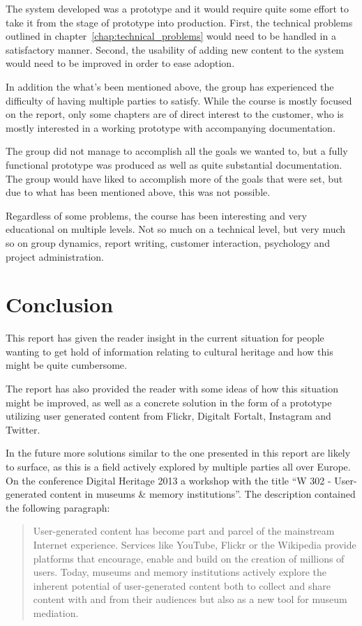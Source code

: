 \documentclass[11pt]{book}
\begin{document}
The system developed was a prototype and it would require quite some effort to take it from the stage of prototype into production. First, the technical problems outlined in chapter~\ref{chap:technical_problems} would need to be handled in a satisfactory manner. Second, the usability of adding new content to the system would need to be improved in order to ease adoption.

In addition the what's been mentioned above, the group has experienced the difficulty of having multiple parties to satisfy. While the course is mostly focused on the report, only some chapters are of direct interest to the customer, who is mostly interested in a working prototype with accompanying documentation.

The group did not manage to accomplish all the goals we wanted to, but a fully functional prototype was produced as well as quite substantial documentation. The group would have liked to accomplish more of the goals that were set, but due to what has been mentioned above, this was not possible.

Regardless of some problems, the course has been interesting and very educational on multiple levels. Not so much on a technical level, but very much so on group dynamics, report writing, customer interaction, psychology and project administration.

\chapter{Conclusion}
This report has given the reader insight in the current situation for people wanting to get hold of information relating to cultural heritage and how this might be quite cumbersome. 

The report has also provided the reader with some ideas of how this situation might be improved, as well as a concrete solution in the form of a prototype utilizing user generated content from Flickr, Digitalt Fortalt, Instagram and Twitter.

In the future more solutions similar to the one presented in this report are likely to surface, as this is a field actively explored by multiple parties all over Europe.
On the conference Digital Heritage 2013 a workshop with the title “W 302 - User-generated content in museums \& memory institutions”. The description contained the following paragraph:

\begin{quotation}\noindent
User-generated content has become part and parcel of the mainstream Internet experience. Services like YouTube, Flickr or the Wikipedia provide platforms that encourage, enable and build on the creation of millions of users. Today, museums and memory institutions actively explore the inherent potential of user-generated content both to collect and share content with and from their audiences but also as a new tool for museum mediation.\cite{digitalHeritage}
\end{quotation}
\end{document}
